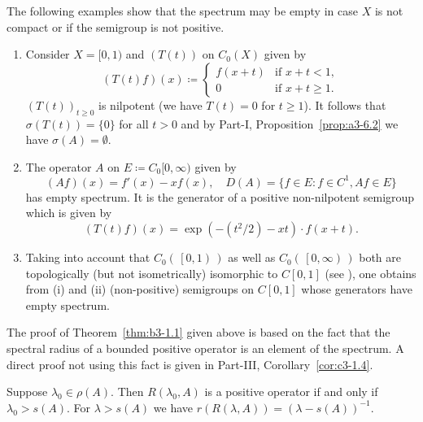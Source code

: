 The following examples show that the spectrum may be empty in case $X$ is not compact or if the semigroup is not positive.
\begin{examples}\label{ex:b3-1.2}
%
\begin{enumerate}[\upshape (i), wide, labelindent=.25em]	
\item  
Consider $X = [0,1)$ and $(T(t))$ on $C_{0}(X)$ given by
%
\begin{equation}\label{eq:b3-1.7}
	(T(t)f)(x) \coloneq \begin{cases} 
		f(x+t) & \text{if } x+t < 1 ,  \\
		0 & \text{if } x+t \geq 1.
	\end{cases}
\end{equation}
$(T(t))_{t\geq 0}$ is nilpotent (we have $T(t) = 0$ for $t \geq 1$).
It follows that $\sigma(T(t)) = \{0\}$ for all $t > 0$ and by Part-I, Proposition~\ref{prop:a3-6.2} we have $\sigma(A) = \emptyset$.

\item 
The operator $A$ on $E \coloneq C_{0}[0,\infty)$ given by
\begin{equation}\label{eq:b3-1.8}
	(Af)(x) = f'(x) - xf(x), \quad D(A) = \{f \in E \colon f \in C^1, Af \in E\}
\end{equation}
has empty spectrum.
It is the generator of a positive non-nilpotent semigroup which is given by
\begin{equation}\label{eq:b3-1.9}
	(T(t)f)(x) = \exp(-(t^2/2) - xt) \cdot f(x+t).
\end{equation}
	
\item 
Taking into account that $C_{0}( \, \left[ 0 , 1\right) \, )$ as well as 
$C_{0}( \, \left[ 0 , \infty \right) \, )$ both are topologically (but not isometrically) isomorphic to $C[0,1]$ (see \textcite[Section~21.5]{semadeni:1971}), one obtains from (i) and (ii) (non-positive) semigroups on $C[0,1]$ whose generators have empty spectrum.
\end{enumerate}
\end{examples}
The proof of Theorem~\ref{thm:b3-1.1} given above is based on the fact that the spectral radius of a bounded positive operator is an element of the spectrum.
A direct proof not using this fact is given in Part-III, Corollary~\ref{cor:c3-1.4}.
\begin{corollary}\label{cor:b3-1.3}
	Suppose $\lambda_0 \in \rho(A)$.
	Then $R(\lambda_0,A)$ is a positive operator if and only if\/ $\lambda_0 > s(A)$.
	For $\lambda > s(A)$ we have $r(R(\lambda,A)) = (\lambda - s(A))^{-1}$.
\end{corollary}
